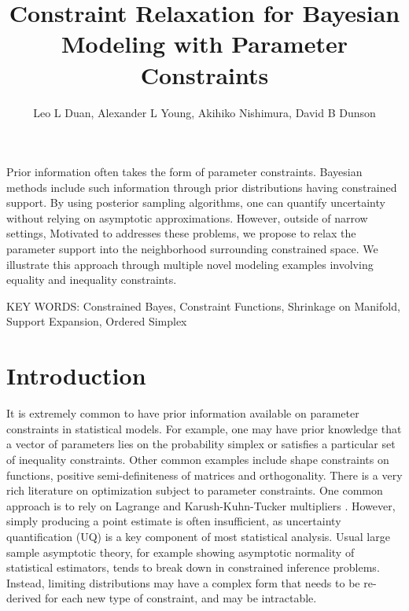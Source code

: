 \documentclass[10pt,fleqn]{article} \pdfoutput=1
\title{\textbf{Constraint Relaxation for Bayesian Modeling with Parameter
Constraints}}
\author{Leo L Duan, Alexander L Young, Akihiko Nishimura, David B Dunson}
\date{}
\newcommand{\leo}[1]{{\color{blue}{#1}}}
\DeclareMathOperator{\1}{\mathbbm{1}} \DeclareMathOperator{\bigO}{\mc O}
\begin{document}

Prior information often takes  the form of parameter constraints. Bayesian
methods include such information through prior distributions having constrained
support. By using posterior sampling algorithms, one can quantify uncertainty
without relying on asymptotic approximations. However, outside of narrow
settings, \leo{the choices of priors and efficient sampling algorithms are
severely limited.  } Motivated to addresses these problems, we propose to
relax the parameter support into the neighborhood surrounding constrained
space. \leo{ This allows us to utilize the much larger family of prior
distributions and off--the--shelf sampling algorithms available in general
unconstrained space.  The relaxed model can be directly used for statistical
inference, or viewed as an approximate solution to the original constrained
problem. We study the constrained and relaxed distributions under multiple
settings, and theoretically quantify their differences. Popular state--of--art
sampling algorithms such as leap-frog Hamiltonian Monte Carlo can be directly
utilized with almost no customization.} We illustrate this approach through
multiple novel modeling examples involving equality and inequality constraints.

\vskip 12pt
	{\noindent KEY WORDS: Constrained Bayes, Constraint
	Functions, Shrinkage on Manifold, Support Expansion, Ordered Simplex}
{}

\newpage

\section{Introduction}

It is extremely common to have prior information available on parameter
constraints in statistical models. For example, one may have prior
knowledge that a vector of parameters lies on the probability simplex or
satisfies a particular set of inequality constraints. Other common examples
include shape constraints on functions, positive semi-definiteness of
matrices and orthogonality. There is a very rich literature on optimization
subject to parameter constraints. One common approach is to rely on Lagrange
and Karush-Kuhn-Tucker multipliers \citep{boyd2004convex}. However, simply
producing a point estimate is often insufficient, as uncertainty
quantification (UQ) is a key component of most statistical analysis. Usual
large sample asymptotic theory, for example showing asymptotic normality of
statistical estimators, tends to break down in constrained inference
problems. Instead, limiting distributions may have a complex form that
needs to be re-derived for each new type of constraint, and may be
intractable.
\end{document}
